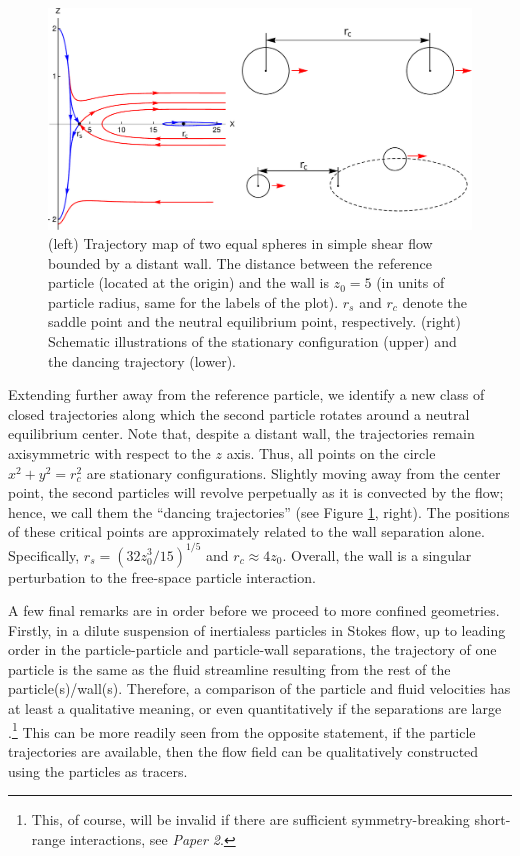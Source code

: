 \begin{figure}%
  \centering
  \includegraphics[width=\columnwidth]{itzhak-boris.pdf}
  \caption{
  (left) Trajectory map of two equal spheres in simple shear flow bounded by a distant wall. The distance between the reference particle (located at the origin) and the wall is $z_0=5$ (in units of particle radius, same for the labels of the plot). $r_s$ and $r_c$ denote the saddle point and the neutral equilibrium point, respectively.
  (right) Schematic illustrations of the stationary configuration (upper) and the dancing trajectory (lower).}
  \label{fig:itzhak-boris}
\end{figure}

Extending further away from the reference particle, we identify a new class of closed trajectories along which the second particle rotates around a neutral equilibrium center. Note that, despite a distant wall, the trajectories remain axisymmetric with respect to the $z$ axis. Thus, all points on the circle $x^2+y^2=r_c^2$ are stationary configurations.
Slightly moving away from the center point, the second particles will revolve perpetually as it is convected by the flow; hence, we call them the ``dancing trajectories'' (see Figure \ref{fig:itzhak-boris}, right).
The positions of these critical points are approximately related to the wall separation alone. Specifically, $r_s=(32z_0^3/15)^{1/5}$ and $r_c \approx 4z_0$.
Overall, the wall is a singular perturbation to the free-space particle interaction.

\medskip
A few final remarks are in order before we proceed to more confined geometries.
Firstly, in a dilute suspension of inertialess particles in Stokes flow, up to leading order in the particle-particle and particle-wall separations, the trajectory of one particle is the same as the fluid streamline resulting from the rest of the particle(s)/wall(s). Therefore, a comparison of the particle and fluid velocities has at least a qualitative meaning, or even quantitatively if the separations are large \citep{zurita-gotor_2007}.\footnote{This, of course, will be invalid if there are sufficient symmetry-breaking short-range interactions, see \eg \emph{Paper 2}.}
This can be more readily seen from the opposite statement, \ie if the particle trajectories are available, then the flow field can be qualitatively constructed using the particles as tracers.


